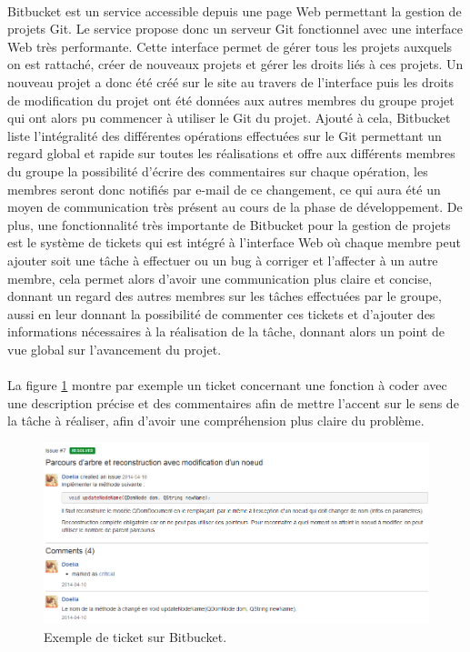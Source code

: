 \paragraph{}       
Bitbucket est un service accessible depuis une page Web permettant la gestion de projets Git. Le service propose donc un serveur Git fonctionnel avec une interface Web très performante. Cette interface permet de gérer tous les projets auxquels on est rattaché, créer de nouveaux projets et gérer les droits liés à ces projets. Un nouveau projet a donc été créé sur le site au travers de l'interface puis les droits de modification du projet ont été données aux autres membres du groupe projet qui ont alors pu commencer à utiliser le Git du projet. Ajouté à cela, Bitbucket liste l'intégralité des différentes opérations effectuées sur le Git permettant un regard global et rapide sur toutes les réalisations et offre aux différents membres du groupe la possibilité d'écrire des commentaires sur chaque opération, les membres seront donc notifiés par e-mail de ce changement, ce qui aura été un moyen de communication très présent au cours de la phase de développement. De plus, une fonctionnalité très importante de Bitbucket pour la gestion de projets est le système de tickets qui est intégré à l'interface Web où chaque membre peut ajouter soit une tâche à effectuer ou un bug à corriger et l'affecter à un autre membre, cela permet alors d'avoir une communication plus claire et concise, donnant un regard des autres membres sur les tâches effectuées par le groupe, aussi en leur donnant la possibilité de commenter ces tickets et d'ajouter des informations nécessaires à la réalisation de la tâche, donnant alors un point de vue global sur l'avancement du projet.
\paragraph{}
La figure \ref{ticket_Bitbucket} montre par exemple un ticket concernant une fonction à coder avec une description précise et des commentaires afin de mettre l'accent sur le sens de la tâche à réaliser, afin d'avoir une compréhension plus claire du problème.
\begin{figure}[!h]
      \centering
      \includegraphics[scale=0.5]{images/bitbucket-exemple-issue.png}
      \caption[Exemple de ticket sur Bitbucket]{Exemple de ticket sur Bitbucket.}
      \label{ticket_Bitbucket}
\end{figure}

